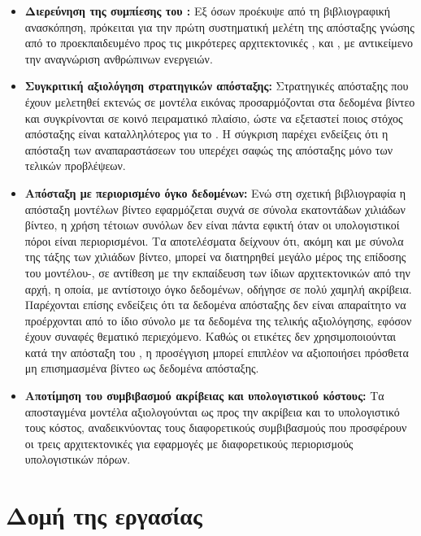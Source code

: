 \begin{itemize}
    \item \textbf{Διερεύνηση της συμπίεσης του :} Εξ όσων
    προέκυψε από τη βιβλιογραφική ανασκόπηση, πρόκειται για την πρώτη
    συστηματική μελέτη της απόσταξης γνώσης από το προεκπαιδευμένο
     προς τις μικρότερες αρχιτεκτονικές ,
     και , με αντικείμενο την αναγνώριση ανθρώπινων
    ενεργειών.

    \item \textbf{Συγκριτική αξιολόγηση στρατηγικών απόσταξης:}
    Στρατηγικές απόσταξης που έχουν μελετηθεί εκτενώς σε μοντέλα εικόνας
    προσαρμόζονται στα δεδομένα βίντεο και συγκρίνονται σε κοινό
    πειραματικό πλαίσιο, ώστε να εξεταστεί ποιος στόχος απόσταξης είναι
    καταλληλότερος για το . Η σύγκριση παρέχει ενδείξεις ότι η
    απόσταξη των αναπαραστάσεων του  υπερέχει σαφώς της
    απόσταξης μόνο των τελικών προβλέψεων.

    \item \textbf{Απόσταξη με περιορισμένο όγκο δεδομένων:}
    Ενώ στη σχετική βιβλιογραφία η απόσταξη μοντέλων βίντεο εφαρμόζεται
    συχνά σε σύνολα εκατοντάδων χιλιάδων βίντεο, η χρήση τέτοιων συνόλων
    δεν είναι πάντα εφικτή όταν οι υπολογιστικοί πόροι είναι περιορισμένοι.
    Τα αποτελέσματα δείχνουν ότι, ακόμη και με σύνολα της τάξης των
    χιλιάδων βίντεο, μπορεί να διατηρηθεί μεγάλο μέρος της επίδοσης του
    μοντέλου-, σε αντίθεση με την εκπαίδευση των ίδιων
    αρχιτεκτονικών από την αρχή, η οποία, με αντίστοιχο όγκο δεδομένων,
    οδήγησε σε πολύ χαμηλή ακρίβεια. Παρέχονται επίσης ενδείξεις ότι τα δεδομένα
    απόσταξης δεν είναι απαραίτητο να προέρχονται από το ίδιο σύνολο με τα
    δεδομένα της τελικής αξιολόγησης, εφόσον έχουν συναφές θεματικό
    περιεχόμενο. Καθώς οι ετικέτες δεν χρησιμοποιούνται κατά την απόσταξη
    του , η προσέγγιση μπορεί επιπλέον να αξιοποιήσει πρόσθετα
    μη επισημασμένα βίντεο ως δεδομένα απόσταξης.

    \item \textbf{Αποτίμηση του συμβιβασμού ακρίβειας και υπολογιστικού
    κόστους:} Τα αποσταγμένα μοντέλα αξιολογούνται ως προς την ακρίβεια
    και το υπολογιστικό τους κόστος, αναδεικνύοντας τους διαφορετικούς
    συμβιβασμούς που προσφέρουν οι τρεις αρχιτεκτονικές για εφαρμογές με
    διαφορετικούς περιορισμούς υπολογιστικών πόρων.
\end{itemize}

\section{Δομή της εργασίας}
\label{sec:intro-structure}

